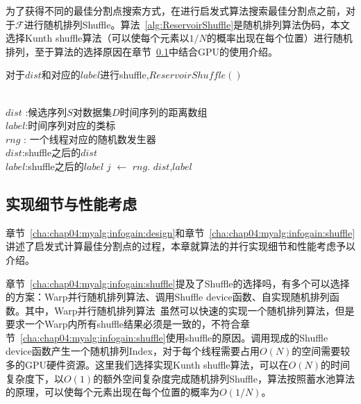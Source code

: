 为了获得不同的最佳分割点搜索方式，在进行启发式算法搜索最佳分割点之前，对于$\mathcal{F}$进行随机排列Shuffle。算法~\ref{alg:ReservoirShuffle}是随机排列算法伪码，本文选择Kunth shuffle算法（可以使每个元素以$1/N$的概率出现在每个位置）进行随机排列，至于算法的选择原因在章节~\ref{cha:chap04:Heuristic:Skill}中结合GPU的使用介绍。

\begin{algorithm}
	\caption{对于$dist$和对应的$label$进行shuffle,$ReservoirShuffle()$}
	\label{alg:ReservoirShuffle}
	\begin{algorithmic}[1]
		\Require ~~\\
		$dist$ :候选序列$S$对数据集$D$时间序列的距离数组\\
		$label$:时间序列对应的类标\\
		$rng$ : 一个线程对应的随机数发生器
		\Ensure ~~\\
		$dist$:shuffle之后的$dist$\\
		$label$:shuffle之后的$label$
				\State $j$ $\gets$ $rng.$
					\State {}
					\State {}
				\EndIf
			\EndFor
			\State \Return $dist$,$label$
		\EndFunction
	\end{algorithmic}
\end{algorithm}

\subsection{实现细节与性能考虑}
\label{cha:chap04:Heuristic:Skill}

章节~\ref{cha:chap04:myalg:infogain:design}和章节~\ref{cha:chap04:myalg:infogain:shuffle}讲述了启发式计算最佳分割点的过程，本章就算法的并行实现细节和性能考虑予以介绍。

章节~\ref{cha:chap04:myalg:infogain:shuffle}提及了Shuffle的选择吗，有多个可以选择的方案：Warp并行随机排列算法、调用Shuffle device函数、自实现随机排列函数。其中，Warp并行随机排列算法~\cite{nvidia2015c}虽然可以快速的实现一个随机排列算法，但是要求一个Warp内所有shuffle结果必须是一致的，不符合章节~\ref{cha:chap04:myalg:infogain:shuffle}使用shuffle的原因。调用现成的Shuffle device函数产生一个随机排列Index，对于每个线程需要占用$O(N)$的空间需要较多的GPU硬件资源。这里我们选择实现Kunth shuffle算法，可以在$O(N)$的时间复杂度下，以$O(1)$的额外空间复杂度完成随机排列Shuffle，算法按照蓄水池算法的原理，可以使每个元素出现在每个位置的概率为$O(1/N)$。

